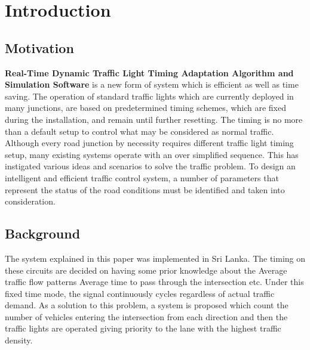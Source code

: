 \documentclass{SureshLimkar}
\begin{document}
\maketitlepage %

\newpage

\makecertipage %

\newpage

\makeackpage %

\newpage

\makeabstrpage %

\tableofcontents

\listoffigures

\listoftables


\chapter{Introduction}
\section{Motivation}
\hspace {0.5 in}\textbf{Real-Time Dynamic Traffic Light Timing Adaptation Algorithm and Simulation Software} is a new form of system which is efficient as well as time saving. The operation of standard traffic lights which are currently deployed in many junctions, are based on predetermined timing schemes, which are fixed during the installation, and remain until further resetting. The timing is no more than a default setup to control what may be considered as normal traffic. Although every road junction by necessity requires different traffic light timing setup, many existing systems operate with an over simplified sequence. This has instigated various ideas and scenarios to solve the traffic problem. To design an intelligent and efficient traffic control system, a number of parameters that represent the status of the road conditions must be identified and taken into consideration.

\section{Background}

\hspace {0.5 in}The system explained in this paper was implemented in Sri Lanka. The timing on these circuits are decided on having some prior knowledge about the 
\hspace {0.5 in} Average traffic flow patterns 
\hspace {0.5 in}Average time to pass through the intersection etc.
\hspace {0.5 in}Under this fixed time mode, the signal continuously cycles regardless of actual traffic demand. As a solution to this problem, a system is proposed which count the number of vehicles entering the intersection from each direction and then the traffic lights are operated giving priority to the lane with the highest traffic density. 
\end{document}
